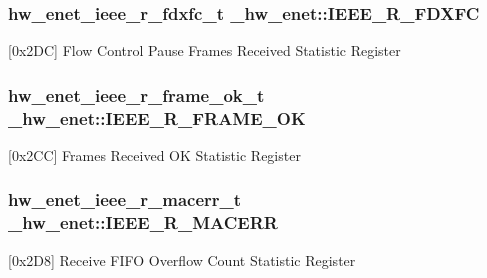 \subsubsection[{\texorpdfstring{I\+E\+E\+E\+\_\+\+R\+\_\+\+F\+D\+X\+FC}{IEEE_R_FDXFC}}]{ {\bf hw\+\_\+enet\+\_\+ieee\+\_\+r\+\_\+fdxfc\+\_\+t} \+\_\+hw\+\_\+enet\+::\+I\+E\+E\+E\+\_\+\+R\+\_\+\+F\+D\+X\+FC}\hypertarget{struct__hw__enet_a4b1833b00202054b758c3d67aa21a2fb}{}\label{struct__hw__enet_a4b1833b00202054b758c3d67aa21a2fb}
\mbox{[}0x2\+DC\mbox{]} Flow Control Pause Frames Received Statistic Register 
\subsubsection[{\texorpdfstring{I\+E\+E\+E\+\_\+\+R\+\_\+\+F\+R\+A\+M\+E\+\_\+\+OK}{IEEE_R_FRAME_OK}}]{ {\bf hw\+\_\+enet\+\_\+ieee\+\_\+r\+\_\+frame\+\_\+ok\+\_\+t} \+\_\+hw\+\_\+enet\+::\+I\+E\+E\+E\+\_\+\+R\+\_\+\+F\+R\+A\+M\+E\+\_\+\+OK}\hypertarget{struct__hw__enet_a16be28b6e3aa41eb8230b8a88d833844}{}\label{struct__hw__enet_a16be28b6e3aa41eb8230b8a88d833844}
\mbox{[}0x2\+CC\mbox{]} Frames Received OK Statistic Register 
\subsubsection[{\texorpdfstring{I\+E\+E\+E\+\_\+\+R\+\_\+\+M\+A\+C\+E\+RR}{IEEE_R_MACERR}}]{ {\bf hw\+\_\+enet\+\_\+ieee\+\_\+r\+\_\+macerr\+\_\+t} \+\_\+hw\+\_\+enet\+::\+I\+E\+E\+E\+\_\+\+R\+\_\+\+M\+A\+C\+E\+RR}\hypertarget{struct__hw__enet_ad2089f90414f19d727288c7b30eced66}{}\label{struct__hw__enet_ad2089f90414f19d727288c7b30eced66}
\mbox{[}0x2\+D8\mbox{]} Receive F\+I\+FO Overflow Count Statistic Register 
